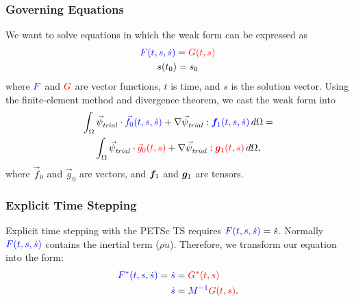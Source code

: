 \documentclass[aspectratio=169]{beamer}
\begin{document}
\begin{frame}
  \frametitle{Governing Equations}
  \summary{}

  We want to solve equations in which the weak form can be expressed
  as
  \begin{gather}
    {\color{blue}F(t,s,\dot{s})} = {\color{red}G(t,s)} \\
    s(t_0) = s_0
  \end{gather}
  where ${\color{blue}F}$ and ${\color{red}G}$ are vector functions, $t$ is time, and $s$ is the solution vector.
  \vfill
  Using the finite-element method and divergence theorem, we cast the weak form into
  \begin{multline}
    \int_\Omega {\vec{\psi}_\mathit{trial}^{}} \cdot {\color{blue}\vec{f}_0(t,s,\dot{s})} + \nabla {\vec{\psi}_\mathit{trial}^{}} : {\color{blue}\bm{f}
    _1(t,s,\dot{s})} \, 
    d\Omega = \\
    \int_\Omega {\vec{\psi}_\mathit{trial}^{}} \cdot {\color{red}\vec{g}_0(t,s)} + \nabla {\vec{\psi}_\mathit{trial}^{}} : {\color{red}\bm{g}_1(t,s)} \, 
    d\Omega,
  \end{multline}
  where $\vec{f}_0$ and $\vec{g}_0$ are vectors, and $\bm{f}_1$ and
  $\bm{g}_1$ are tensors.

\end{frame}

\begin{frame}
  \frametitle{Explicit Time Stepping}
  \summary{}

  Explicit time stepping with the PETSc TS requires ${\color{blue}F(t,s,\dot{s})} = \dot{s}$.
  \vfill
  Normally ${\color{blue}F(t,s,\dot{s})}$ contains the inertial term ($\rho \ddot{u}$).
  \vfill
  Therefore, we transform our equation into the form:
  \begin{align}
    {\color{blue}F^*(t,s,\dot{s})} = {\color{blue}\dot{s}} &= {\color{red}G^*(t,s)} \\
    {\color{blue}\dot{s}} &= {\color{blue}M^{-1}}{\color{red}G(t,s)}.
  \end{align}  

\end{frame}
\end{document}

